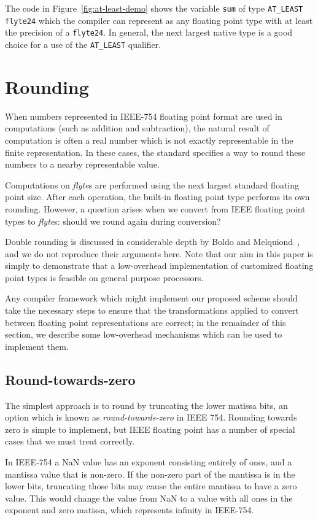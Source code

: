\documentclass{sig-alternate-05-2015}
\newcommand{\mt}[1]{\texttt{#1}}
\begin{document}
\noindent The code in Figure~\ref{fig:at-least-demo} shows the variable
\mt{sum} of type \mt{AT\_LEAST flyte24} which the compiler can represent as any
floating point type with at least the precision of a \mt{flyte24}. In general,
the next largest native type is a good choice for a use of the \mt{AT\_LEAST}
qualifier.


\section{Rounding}
\label{sec:rounding}

When numbers represented in IEEE-754 floating point format are used in
computations (such as addition and subtraction), the natural result of
computation is often a real number which is not exactly representable in the
finite representation. In these cases, the standard specifies a way to round
these numbers to a nearby representable value.

Computations on \textit{flyte}s are performed using the next largest
standard floating point size.  After each operation, the built-in
floating point type performs its own rounding. However, a question
arises when we convert from IEEE floating point types to
\textit{flyte}s: should we round again during conversion?

Double rounding is discussed in considerable depth by Boldo and
Melquiond~\cite{boldo2004double}, and we do not reproduce their arguments here.
Note that our aim in this paper is simply to demonstrate that a low-overhead
implementation of customized floating point types is feasible on general
purpose processors.

Any compiler framework which might implement our proposed
scheme should take the necessary steps to ensure that the transformations
applied to convert between floating point representations are correct; in the
remainder of this section, we describe some low-overhead mechanisms which can
be used to implement them.

\subsection{Round-towards-zero}
\label{fig:round-towards-zero}
The simplest approach is to round by truncating the lower matissa
bits, an option which is known as \textit{round-towards-zero} in IEEE
754. Rounding towards zero is simple to implement, but IEEE floating
point has a number of special cases that we must treat correctly.

In IEEE-754 a NaN value has an exponent consisting entirely of ones, and a
mantissa value that is non-zero. If the non-zero part of the mantissa is in the
lower bits, truncating those bits may cause the entire mantissa to have a zero
value.  This would change the value from NaN to a value with all ones in the
exponent and zero matissa, which represents infinity in IEEE-754.
\end{document}
